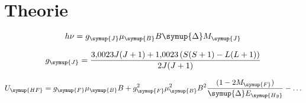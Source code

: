 \section{Theorie}
\label{sec:theorie}

\begin{equation}
  h\nu=g_{\symup{J}}\mu_{\symup{B}}B\symup{\Delta}M_{\symup{J}}
  \label{eq:übergangsenergie}
\end{equation}

\begin{equation}
  g_{\symup{J}}=\frac{\num{3.0023}J(J+1)+\num{1.0023}\left(S(S+1)-L(L+1)\right)}{2J(J+1)}
  \label{eq:gj}
\end{equation}

\begin{equation}
  U_{\symup{HF}}=g_{\symup{F}}\mu_{\symup{B}}B
  +g_{\symup{F}}^2\mu_{\symup{B}}^2B^2
  \frac{(1-2M_{\symup{F}})}{\symup{\Delta}E_{\symup{Hy}}}-\ldots
  \label{eq:zeemanenergie}
\end{equation}
